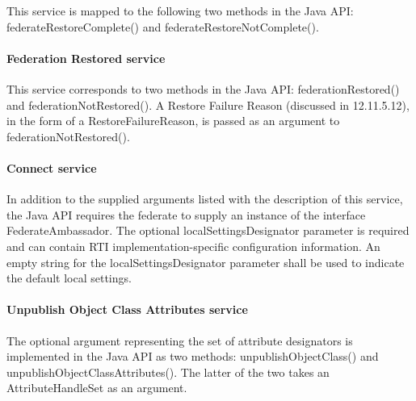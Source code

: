 \begin{compactstdpage}
    This service is mapped to the following two methods in the Java API: federateRestoreComplete() and federateRestoreNotComplete().

    \paragraph{Federation Restored \rtiinitiated{} service}

    This service corresponds to two methods in the Java API: federationRestored() and federationNotRestored(). A Restore Failure Reason (discussed in 12.11.5.12), in the form of a RestoreFailureReason, is passed as an argument to federationNotRestored().

    \paragraph{Connect service}

    In addition to the supplied arguments listed with the description of this service, the Java API requires the federate to supply an instance of the interface FederateAmbassador. The optional localSettingsDesignator parameter is required and can contain RTI implementation-specific configuration information. An empty string for the localSettingsDesignator parameter shall be used to indicate the default local settings.

    \paragraph{Unpublish Object Class Attributes service}

    The optional argument representing the set of attribute designators is implemented in the Java API as two methods: unpublishObjectClass() and unpublishObjectClassAttributes(). The latter of the two takes an AttributeHandleSet as an argument.

\end{compactstdpage}

\clearpage

